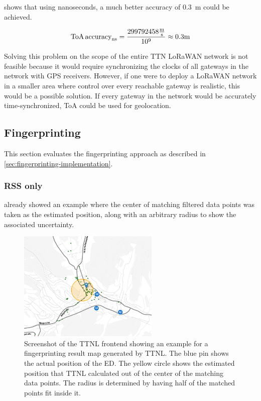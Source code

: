  shows that using nanoseconds, a much better accuracy of \SI{0.3}{\meter} could be achieved.

\begin{equation}\label{eq:toa-accuracy-ttn-nanoseconds}
    \text{ToA\,accuracy}_{\si{\nano\second}} = \frac{299792458 \frac{\si{\meter}}{\si{\second}}}{10^9} \approx 0.3 \si{\meter}
\end{equation}

Solving this problem on the scope of the entire \ac{TTN} \ac{LoRaWAN} network is not feasible because it would require synchronizing the clocks of all gateways in the network with \ac{GPS} receivers.
However, if one were to deploy a \ac{LoRaWAN} network in a smaller area where control over every reachable gateway is realistic, this would be a possible solution.
If every gateway in the network would be accurately time-synchronized, \ac{ToA} could be used for geolocation.

\subsection{Fingerprinting}\label{subsec:conclusion-fingerprinting}

This section evaluates the fingerprinting approach as described in \cref{sec:fingerprinting-implementation}.

\subsubsection{\acl{RSS} only}

 already showed an example where the center of matching filtered data points was taken as the estimated position, along with an arbitrary radius to show the associated uncertainty.

\begin{figure}[htbp]
    \centering
    \includegraphics[width=0.6\textwidth]{pictures/ttn-locator/frontend/fingerprinting/rssi_similarity_map_example_dynamic_radius.png}
    \caption{
        Screenshot of the \ac{TTNL} frontend showing an example for a fingerprinting result map generated by \ac{TTNL}.
        The blue pin shows the actual position of the \acl{ED}.
        The yellow circle shows the estimated position that \ac{TTNL} calculated out of the center of the matching data points.
        The radius is determined by having half of the matched points fit inside it.
    }\label{fig:fingerprinting-map-example-dynamic-radius}
\end{figure}

